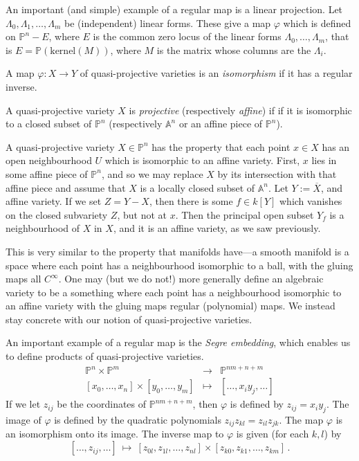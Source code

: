 \documentclass[12pt]{amsart}
\begin{document}
An important (and simple) example of a regular map is a linear projection.
Let $\Lambda_0,\Lambda_1,\ldots,\Lambda_m$ be (independent) linear forms.
These give a map $\varphi$ which is defined on 
${\mathbb P}^n-E$, where $E$ is the common zero locus of the linear forms
$\Lambda_0,\ldots,\Lambda_m$, that is 
$E={\mathbb P}(\mbox{kernel}(M))$, where $M$ is the matrix whose columns are
the $\Lambda_i$.


A map $\varphi\colon X\to Y$ of quasi-projective varieties is an 
{\it isomorphism} if it has a regular inverse.
\medskip

A quasi-projective variety $X$ is {\it projective} (respectively 
{\it affine}) if if it is isomorphic to a closed subset of 
${\mathbb P}^n$ (respectively ${\mathbb A}^n$ or an affine piece of 
${\mathbb P}^n$).
\medskip

A quasi-projective variety $X\in {\mathbb P}^n$ has the property that each
point $x\in X$ has 
an open neighbourhood $U$ which is isomorphic to an affine variety.
First, $x$ lies in some affine piece of ${\mathbb P}^n$, and so we may
replace $X$ by its intersection with that affine piece and assume that $X$
is a locally closed subset of ${\mathbb A}^n$.
Let $Y:=\overline{X}$, and affine variety.
If we set $Z=Y-X$, then there is some $f\in k[Y]$ which vanishes on the
closed subvariety $Z$, but not at $x$.
Then the principal open subset $Y_f$ is a neighbourhood of $X$ in $X$, and
it is an affine variety, as we saw previously.

This is very similar to the property that manifolds have---a smooth manifold
is a space where each point has a neighbourhood isomorphic to a ball, with
the gluing maps all $C^\infty$.
One may (but we do not!) more generally define an algebraic variety to be a
something where each point has a neighbourhood isomorphic to an affine
variety with the gluing maps regular (polynomial) maps.
We instead stay concrete with our notion of quasi-projective varieties.


An important example of a regular map is the {\it Segre embedding}, which
enables us to define products of quasi-projective varieties.
\begin{eqnarray*}
  {\mathbb P}^n\times{\mathbb P^m}&\longrightarrow&
       {\mathbb P}^{nm+n+m}\\
   {[x_0,\ldots,x_n]} 
   \times [y_0,\ldots,y_m]
       &\longmapsto&
    [\ldots,x_iy_j,\ldots]
\end{eqnarray*}
If we let $z_{ij}$ be the coordinates of ${\mathbb P}^{nm+n+m}$,
then $\varphi$ is defined by $z_{ij}=x_iy_j$.
The image of $\varphi$ is defined by the quadratic polynomials
$z_{ij}z_{kl}=z_{il}z_{jk}$.
The map $\varphi$ is an isomorphism onto its image.
The inverse map to $\varphi$ is given (for each $k,l$) by
$$
  [\ldots,z_{ij},\ldots]\ \longmapsto\ 
  [z_{0l},z_{1l},\ldots,z_{nl}]\times
  [z_{k0},z_{k1},\ldots,z_{km}]\,.
$$
\end{document}
